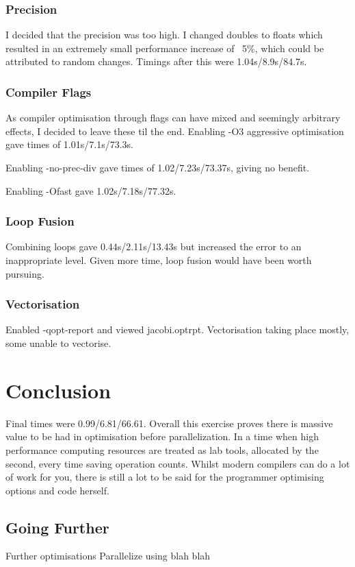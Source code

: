 \documentclass[10pt]{article}
\begin{document}
\subsubsection{Precision}
I decided that the precision was too high. I changed doubles to floats
which resulted in an extremely small performance increase of ~5\%,
which could be attributed to random changes. Timings after this were
1.04s/8.9s/84.7s.

\subsubsection{Compiler Flags}
As compiler optimisation through flags can have mixed and seemingly
arbitrary effects, I decided to leave these til the end. Enabling -O3
aggressive optimisation gave times of 1.01s/7.1s/73.3s.

Enabling -no-prec-div gave times of 1.02/7.23s/73.37s, giving no
benefit.

Enabling -Ofast gave 1.02s/7.18s/77.32s.

\subsubsection{Loop Fusion}
Combining loops gave 0.44s/2.11s/13.43s but increased the error to an
inappropriate level. Given more time, loop fusion would have been
worth pursuing.

\subsubsection{Vectorisation}
Enabled -qopt-report and viewed jacobi.optrpt. Vectorisation taking
place mostly, some unable to vectorise.

\section{Conclusion}
Final times were 0.99/6.81/66.61. Overall this exercise proves there
is massive value to be had in optimisation before parallelization. In
a time when high performance computing resources are treated as lab
tools, allocated by the second, every time saving operation
counts. Whilst modern compilers can do a lot of work for you, there is
still a lot to be said for the programmer optimising options and code
herself.

\subsection{Going Further}
Further optimisations
Parallelize using blah blah
\end{document}
